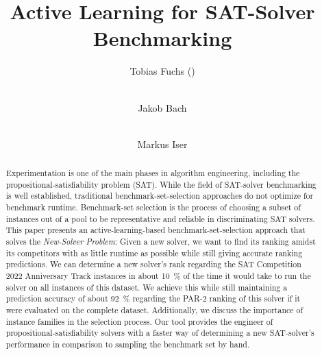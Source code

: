 \documentclass[runningheads]{llncs}
\begin{document}
\title{Active Learning for SAT-Solver Benchmarking}

\author{
	Tobias Fuchs (\Letter) \and \\
	Jakob Bach \and \\
	Markus Iser
}



\maketitle

\begin{abstract}
  Experimentation is one of the main phases in algorithm engineering, including the propositional-sat\-is\-fia\-bi\-li\-ty problem (SAT).
  While the field of SAT-solver benchmarking is well established, traditional bench\-mark-set-selection approaches do not optimize for benchmark runtime.
  Benchmark-set selection is the process of choosing a subset of instances out of a pool to be representative and reliable in discriminating SAT solvers.
  This paper presents an active-learning-based benchmark-set-selec\-tion approach that solves the \emph{New-Solver Problem}:
  Given a new solver, we want to find its ranking amidst its competitors with as little runtime as possible while still giving accurate ranking predictions.
  We can determine a new solver's rank regarding the SAT Competition 2022 Anniversary Track instances in about \SI{10}{\%} of the time it would take to run the solver on all instances of this dataset.
  We achieve this while still maintaining a prediction accuracy of about \SI{92}{\%} regarding the PAR-2 ranking of this solver if it were evaluated on the complete dataset.
  Additionally, we discuss the importance of instance families in the selection process. 
  Our tool provides the engineer of propositional-satisfiability solvers with a faster way of determining a new SAT-solver's performance in comparison to sampling the benchmark set by hand.

\end{abstract}
\end{document}
